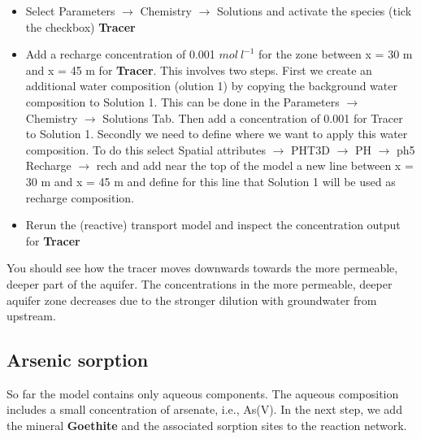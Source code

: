 \begin{itemize}

\item Select Parameters $\rightarrow$ Chemistry $\rightarrow$ Solutions and 
activate the species (tick the checkbox) {\color{red} \textbf{Tracer}} 

\item Add a recharge concentration of 0.001 $mol\ l^{-1}$ for the zone between x = 30 m and x = 45 m for {\color{red} \textbf{Tracer}}. This involves two steps. First we create an additional water composition (olution 1) by copying the background water composition to Solution 1. This can be done in the Parameters $\rightarrow$ Chemistry $\rightarrow$ Solutions Tab. Then add a concentration of 0.001 for Tracer to Solution 1. 
Secondly we need to define where we want to apply this water composition. To do this select Spatial attributes $\rightarrow$ PHT3D $\rightarrow$ PH  $\rightarrow$ ph5 Recharge  $\rightarrow$ rech and add near the top of the model a new line between x = 30 m and x = 45 m and define for this line that Solution 1 will be used as recharge composition.    

\item Rerun the (reactive) transport model and inspect the concentration output for {\color{red} \textbf{Tracer}}
  

\end{itemize}

You should see how the tracer moves downwards towards the more permeable, deeper part of the aquifer. The concentrations in the more permeable, deeper aquifer zone decreases due to the stronger dilution with groundwater from upstream.  

\subsection[Arsenic sorption]{Arsenic sorption} 

So far the model contains only aqueous components. The aqueous composition includes a small concentration of arsenate, i.e., As(V). In the next step, we add the mineral {\color{red} \textbf{Goethite}} and the associated sorption sites to the reaction network.  

